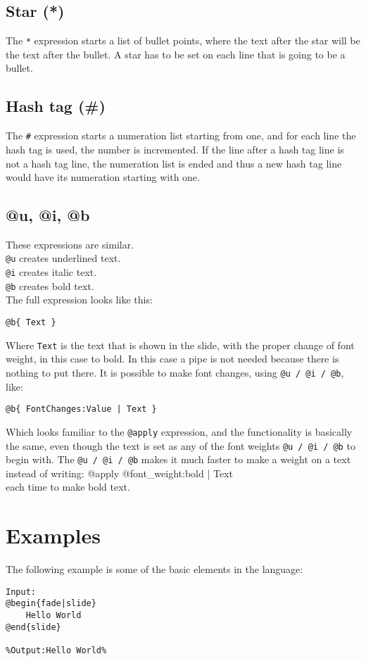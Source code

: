 \subsection{Star (*)}
The \texttt{*} expression starts a list of bullet points, where the text after the star will be the text after the bullet.
A star has to be set on each line that is going to be a bullet.

\subsection{Hash tag (\#)}
The \texttt{\#} expression starts a numeration list starting from one, and for each line the hash tag is used, the number is incremented. If the line after a hash tag line is not a hash tag line, the numeration list is ended and thus a new hash tag line would have its numeration starting with one.

\subsection{@u, @i, @b}
These expressions are similar. \\
\texttt{@u} creates underlined text. \\
\texttt{@i} creates italic text. \\
\texttt{@b} creates bold text. \\
The full expression looks like this:
\begin{lstlisting}[frame=single]
@b{ Text }
\end{lstlisting}
Where \texttt{Text} is the text that is shown in the slide, with the proper change of font weight, in this case to bold. In this case a pipe is not needed because there is nothing to put there. 
It is possible to make font changes, using \texttt{@u / @i / @b}, like:
 \begin{lstlisting}[frame=single]
@b{ FontChanges:Value | Text }
\end{lstlisting}
Which looks familiar to the \texttt{@apply} expression, and the functionality is basically the same, even though the text is set as any of the font weights \texttt{@u / @i / @b} to begin with. The \texttt{@u / @i / @b} makes it much faster to make a weight on a text instead of writing: @apply{ @font\_weight:bold | Text } \\
each time to make bold text.

\section{Examples}
The following example is some of the basic elements in the language:
\begin{lstlisting}[frame=single]
Input:
@begin{fade|slide}
    Hello World
@end{slide}

%Output:Hello World%
\end{lstlisting}


